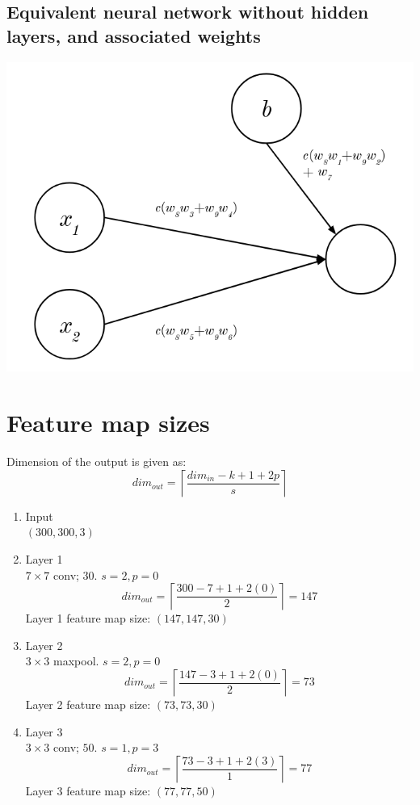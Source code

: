 \documentclass[twocolumn, 9pt]{article}
\begin{document}
\subsection*{Equivalent neural network without hidden layers, and associated weights}
\includegraphics[width=\columnwidth]{net.png}

\section{Feature map sizes}
Dimension of the output is given as:
\begin{equation*}
	dim_{out} = \left\lceil\dfrac{dim_{in}-k+1+2p}{s}\right\rceil
\end{equation*}
\begin{enumerate}
	\item Input\\
		  $(300,300,3)$
	\item Layer 1\\
		  $7\times7$ conv; $30$. $s=2, p=0$\\
		  \begin{equation*}
		  dim_{out} = \left\lceil\dfrac{300-7+1+2(0)}{2}\right\rceil = 147
		  \end{equation*}
		  Layer 1 feature map size: $(147,147,30)$
	\item Layer 2\\
		  $3\times3$ maxpool. $s=2, p=0$\\
		  \begin{equation*}
		  dim_{out} = \left\lceil\dfrac{147-3+1+2(0)}{2}\right\rceil = 73
		  \end{equation*}
		  Layer 2 feature map size: $(73,73,30)$
	\item Layer 3\\
		  $3\times3$ conv; $50$. $s=1, p=3$\\
		  \begin{equation*}
		  dim_{out} = \left\lceil\dfrac{73-3+1+2(3)}{1}\right\rceil = 77
		  \end{equation*}
		  Layer 3 feature map size: $(77,77,50)$
\end{enumerate}
\end{document}
